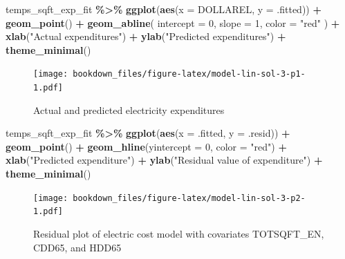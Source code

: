 \documentclass[
]{krantz}
\makeatletter
\newenvironment{Shaded}{\begin{snugshade}}{\end{snugshade}}
\newcommand{\AttributeTok}[1]{\textcolor[rgb]{0.27,0.27,0.27}{#1}}
\newcommand{\DecValTok}[1]{\textcolor[rgb]{0.06,0.06,0.06}{#1}}
\newcommand{\FunctionTok}[1]{\textcolor[rgb]{0.27,0.27,0.27}{\textbf{#1}}}
\newcommand{\NormalTok}[1]{#1}
\newcommand{\SpecialCharTok}[1]{\textcolor[rgb]{0.43,0.43,0.43}{\textbf{#1}}}
\newcommand{\StringTok}[1]{\textcolor[rgb]{0.5,0.5,0.5}{#1}}
\newenvironment{kframe}{%
\medskip{}
\setlength{\fboxsep}{.8em}
 \def\at@end@of@kframe{}%
 \ifinner\ifhmode%
  \def\at@end@of@kframe{\end{minipage}}%
  \begin{minipage}{\columnwidth}%
 \fi\fi%
 \def\FrameCommand##1{\hskip\@totalleftmargin \hskip-\fboxsep
 \colorbox{shadecolor}{##1}\hskip-\fboxsep
     \hskip-\linewidth \hskip-\@totalleftmargin \hskip\columnwidth}%
 \MakeFramed {\advance\hsize-\width
   \@totalleftmargin\z@ \linewidth\hsize
   \@setminipage}}%
 {\par\unskip\endMakeFramed%
 \at@end@of@kframe}
\renewenvironment{Shaded}{\begin{kframe}}{\end{kframe}}
\makeatother
\begin{document}
\begin{Shaded}
\begin{Highlighting}[]
\NormalTok{temps\_sqft\_exp\_fit }\SpecialCharTok{\%\textgreater{}\%}
  \FunctionTok{ggplot}\NormalTok{(}\FunctionTok{aes}\NormalTok{(}\AttributeTok{x =}\NormalTok{ DOLLAREL, }\AttributeTok{y =}\NormalTok{ .fitted)) }\SpecialCharTok{+}
  \FunctionTok{geom\_point}\NormalTok{() }\SpecialCharTok{+}
  \FunctionTok{geom\_abline}\NormalTok{(}
    \AttributeTok{intercept =} \DecValTok{0}\NormalTok{,}
    \AttributeTok{slope =} \DecValTok{1}\NormalTok{,}
    \AttributeTok{color =} \StringTok{"red"}
\NormalTok{  ) }\SpecialCharTok{+}
  \FunctionTok{xlab}\NormalTok{(}\StringTok{"Actual expenditures"}\NormalTok{) }\SpecialCharTok{+}
  \FunctionTok{ylab}\NormalTok{(}\StringTok{"Predicted expenditures"}\NormalTok{) }\SpecialCharTok{+}
  \FunctionTok{theme\_minimal}\NormalTok{()}
\end{Highlighting}
\end{Shaded}

\begin{figure}
\centering
\texttt{[image: bookdown\_files/figure-latex/model-lin-sol-3-p1-1.pdf]}
\caption{\label{fig:model-lin-sol-3-p1}Actual and predicted electricity expenditures}
\end{figure}

\begin{Shaded}
\begin{Highlighting}[]
\NormalTok{temps\_sqft\_exp\_fit }\SpecialCharTok{\%\textgreater{}\%}
  \FunctionTok{ggplot}\NormalTok{(}\FunctionTok{aes}\NormalTok{(}\AttributeTok{x =}\NormalTok{ .fitted, }\AttributeTok{y =}\NormalTok{ .resid)) }\SpecialCharTok{+}
  \FunctionTok{geom\_point}\NormalTok{() }\SpecialCharTok{+}
  \FunctionTok{geom\_hline}\NormalTok{(}\AttributeTok{yintercept =} \DecValTok{0}\NormalTok{, }\AttributeTok{color =} \StringTok{"red"}\NormalTok{) }\SpecialCharTok{+}
  \FunctionTok{xlab}\NormalTok{(}\StringTok{"Predicted expenditure"}\NormalTok{) }\SpecialCharTok{+}
  \FunctionTok{ylab}\NormalTok{(}\StringTok{"Residual value of expenditure"}\NormalTok{) }\SpecialCharTok{+}
  \FunctionTok{theme\_minimal}\NormalTok{()}
\end{Highlighting}
\end{Shaded}

\begin{figure}
\centering
\texttt{[image: bookdown\_files/figure-latex/model-lin-sol-3-p2-1.pdf]}
\caption{\label{fig:model-lin-sol-3-p2}Residual plot of electric cost model with covariates TOTSQFT\_EN, CDD65, and HDD65}
\end{figure}
\end{document}
